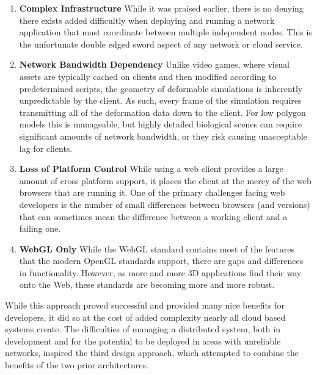  \begin{enumerate}

   \item \textbf{Complex Infrastructure} While it was praised earlier,
     there is no denying there exists added difficultly when deploying
     and running a network application that must coordinate between
     multiple independent nodes. This is the unfortunate double edged
     sword aspect of any network or cloud service.

   \item \textbf{Network Bandwidth Dependency} Unlike video games,
     where visual assets are typically cached on clients and then
     modified according to predetermined scripts, the geometry of
     deformable simulations is inherently unpredictable by the
     client. As such, every frame of the simulation requires
     transmitting all of the deformation data down to the client. For
     low polygon models this is manageable, but highly detailed
     biological scenes can require significant amounts of network
     bandwidth, or they risk causing unacceptable lag for clients.


     \item \textbf{Loss of Platform Control} While using a web client
       provides a large amount of cross platform support, it places
       the client at the mercy of the web browsers that are running
       it. One of the primary challenges facing web developers is the
       number of small differences between browsers (and versions)
       that can sometimes mean the difference between a working client
       and a failing one.

     \item \textbf{WebGL Only} While the WebGL standard contains most
       of the features that the modern OpenGL standards support, there
       are gaps and differences in functionality. However, as more and
       more 3D applications find their way onto the Web, these
       standards are becoming more and more robust.
     
 \end{enumerate}

  While this approach proved successful and provided many nice
  benefits for developers, it did so at the cost of added complexity
  nearly all cloud based systems create. The difficulties of managing
  a distributed system, both in development and for the potential to
  be deployed in areas with unreliable networks, inspired the third
  design approach, which attempted to combine the benefits of the two
  prior architectures.
 
